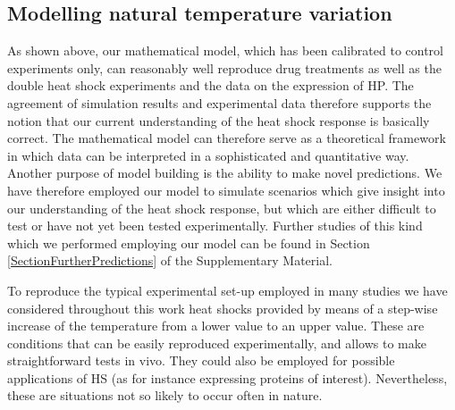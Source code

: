\documentclass[oneside, 10pt, a4paper, twocolumn]{article}
\begin{document}
\subsection{Modelling natural temperature variation}
\label{SecHotDay}
\label{MaximalHPtau}

As shown above, our mathematical model, which has been calibrated to control experiments only, 
can reasonably well reproduce drug treatments as well as the double heat shock experiments and the data on the expression of HP.
The agreement of simulation results and experimental data therefore supports the notion that our current understanding of the heat shock
response is basically correct. The mathematical model can therefore serve as a theoretical framework in which
data can be interpreted in a sophisticated and quantitative way.
Another purpose of model building is the ability to make novel predictions.
We have therefore employed our model to simulate scenarios which give insight into our understanding
of the heat shock response, but which are either difficult to test or have not yet been tested experimentally. Further studies of this kind which we performed employing our model can be found in Section \ref{SectionFurtherPredictions} of the Supplementary Material.



To reproduce the typical experimental set-up employed in many studies we have considered throughout this work heat shocks provided by means of a step-wise increase of the temperature from a lower value to an upper value. These are conditions that can be easily reproduced experimentally, and allows to make straightforward tests in vivo. 
They could also be employed for possible applications of HS (as for instance expressing proteins of interest). %
Nevertheless, these are situations not so likely to occur often in nature.
\end{document}

